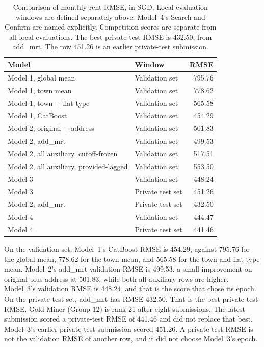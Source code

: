 \documentclass[11pt,a4paper]{article}
\begin{document}
\begin{table}[htbp]
\centering
\caption{Comparison of monthly-rent RMSE, in SGD.
Local evaluation windows are defined separately above.
Model~4's Search and Confirm are named explicitly.
Competition scores are separate from all local evaluations.
The best private-test RMSE is 432.50, from add\_mrt.
The row 451.26 is an earlier private-test submission.}
\label{tab:headline}
\small
\setlength{\tabcolsep}{3pt}
\begin{tabularx}{\textwidth}{@{}>{\raggedright\arraybackslash}p{} X r@{}}
\toprule
Model & Window & RMSE \\
\midrule
Model 1, global mean & Validation set & 795.76 \\
Model 1, town mean & Validation set & 778.62 \\
Model 1, town + flat type & Validation set & 565.58 \\
Model 1, CatBoost & Validation set & 454.29 \\
Model 2, original + address & Validation set & 501.83 \\
Model 2, add\_mrt & Validation set & 499.53 \\
Model 2, all auxiliary, cutoff-frozen & Validation set & 517.51 \\
Model 2, all auxiliary, provided-lagged & Validation set & 553.50 \\
Model 3 & Validation set & 448.24 \\
Model 3 & Private test set & 451.26 \\
Model 2, add\_mrt & Private test set & 432.50 \\
Model 4 & Validation set & 444.47 \\
Model 4 & Private test set & 441.46 \\
\bottomrule
\end{tabularx}
\end{table}

On the validation set, Model~1's CatBoost RMSE is 454.29, against 795.76 for the global mean, 778.62 for the town mean, and 565.58 for the town and flat-type mean.
Model~2's add\_mrt validation RMSE is 499.53, a small improvement on original plus address at 501.83, while both all-auxiliary rows are higher.
Model~3's validation RMSE is 448.24, and that is the score that chose its epoch.
On the private test set, add\_mrt has RMSE 432.50.
That is the best private-test RMSE.
Gold Miner (Group 12) is rank 21 after eight submissions.
The latest submission scored a private-test RMSE of 441.46 and did not replace that best.
Model~3's earlier private-test submission scored 451.26.
A private-test RMSE is not the validation RMSE of another row, and it did not choose Model~3's epoch.
\end{document}
